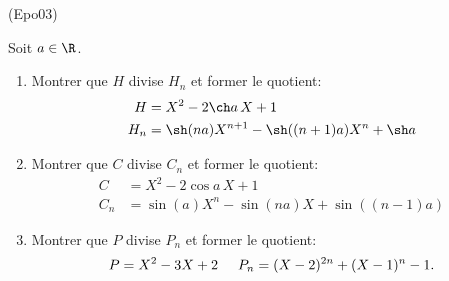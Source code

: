 \begin{tiny}(Epo03)\end{tiny} Soit $a\in \R$.
\begin{enumerate}
  \item Montrer que $H$ divise $H_{n}$ et former le quotient:
\begin{align*}
H &= X^{2}-2\ch a\,X +1 \\
H_{n} &= \sh(na)X^{n+1}-\sh((n+1)a)X^{n}+\sh a
\end{align*}

  \item Montrer que $C$ divise $C_{n}$ et former le quotient:
\begin{align*}
C &= X^{2}-2\cos a\,X +1 \\
C_{n} &= \sin(a)X^{n} - \sin(na)X + \sin((n-1)a)
\end{align*}

  \item Montrer que $P$ divise $P_{n}$ et former le quotient:
\[
P = X^{2}-3X + 2 \hspace{0.5cm}
P_{n} = (X-2)^{2n} + (X-1)^n - 1.
\]
\end{enumerate}
